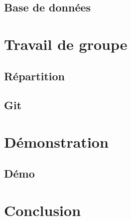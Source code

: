 \documentclass{beamer}
\begin{document}
	    \subsection{Base de données}
	        
	        
    
    \section{Travail de groupe}
        \subsection{Répartition} 
	        
	        
	    \subsection{Git} %
	        
	            
	
	  \section{Démonstration}
        \subsection{Démo}
	        	        
	        
        	
    \section{Conclusion}
        \subsection{}
            
\end{document}
